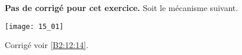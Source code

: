 \normalfalse \difficiletrue \tdifficilefalse
\correctionfalse


\setcounter{numques}{0}
\ifcorrection
\else
\textbf{Pas de corrigé pour cet exercice.}
\fi
\ifprof
\else
Soit le mécanisme suivant.
\begin{center}
\texttt{[image: 15\_01]}
\end{center}
\fi



\ifprof
\else
\fi


\ifprof
\else
\begin{flushright}
\footnotesize{Corrigé  voir \ref{B2:12:14}.}
\end{flushright}%
\fi